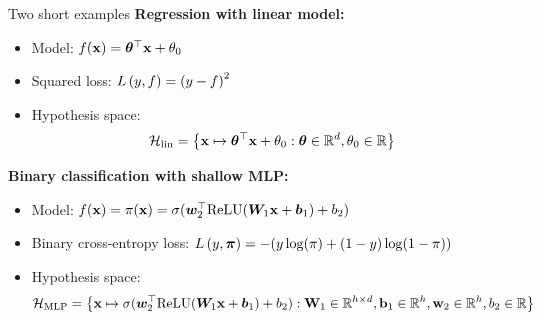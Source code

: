 \documentclass[11pt,compress,t,notes=noshow, xcolor=table]{beamer}
\begin{document}
\begin{vbframe}{Two short examples}
\textbf{Regression with linear model:}\\
\begin{itemize}
    \item Model: $f(\mathbf{x}) = \bm{\theta}^\top \mathbf{x} + \theta_0$
    \item Squared loss:  
    $L\left(y, f\right) = \left(y-f\right)^2$
    \item Hypothesis space: $$\mathcal{H}_{\text{lin}} = \left\{ \mathbf{x} \mapsto \bm{\theta}^\top \mathbf{x} + \theta_0 : \bm{\theta} \in \mathbb{R}^d, \theta_0 \in \mathbb{R} \right\}$$
\end{itemize}

\vspace{0.3cm}

\textbf{Binary classification with shallow MLP:}\\
\begin{itemize}
    \item Model: $f(\mathbf{x}) = \pi(\mathbf{x})= \sigma(\bm{w}_2^{\top} \text{ReLU}(\bm{W}_1 \mathbf{x} + \bm{b}_1) + b_2)$
    \item Binary cross-entropy loss: $L\left(y, \bm{\pi}\right) = -(y\log(\pi)+(1-y)\log(1-\pi))$\\ 
    \item Hypothesis space: {\small $$\mathcal{H}_{\text{MLP}} = \left\{ \mathbf{x} \mapsto \sigma(\bm{w}_2^{\top} \text{ReLU}(\bm{W}_1 \mathbf{x} + \bm{b}_1) + b_2): \mathbf{W}_1 \in \mathbb{R}^{h \times d}, \mathbf{b}_1 \in \mathbb{R}^h, \mathbf{w}_2 \in \mathbb{R}^h, b_2 \in \mathbb{R} \right\}$$}
\end{itemize}
  
\end{vbframe}
\end{document}
